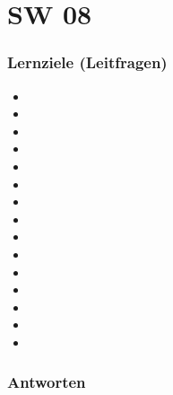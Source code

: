 \part{SW 08}
\section{Lernziele (Leitfragen)}
\begin{itemize}
    \item
    \item
    \item
    \item
    \item
    \item
    \item
    \item
    \item
    \item
    \item
    \item
    \item
    \item
    \item
\end{itemize}

\section{Antworten}
\subsection*{}